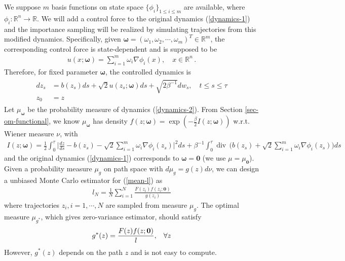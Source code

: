 \documentclass[final]{siamltex}
\begin{document}
We suppose $m$ basis functions on state space $\{\phi_i\}_{1\le i \le m}$ are
available, where $\phi_i : \mathbb{R}^n\rightarrow \mathbb{R}$. 
We will add a control force to the original dynamics (\ref{dynamics-1})
and the importance sampling will be realized by simulating trajectories from
this modified dynamics. Specifically, given $\bm{\omega} = (\omega_1, \omega_2,
\cdots, \omega_m)^T \in \mathbb{R}^m$,
the corresponding control force is state-dependent and is supposed to be 
\begin{align}
  u(x; \bm{\omega}) = \sum\limits_{i = 1}^{m} \omega_i \nabla \phi_i(x), \quad x \in
  \mathbb{R}^n\,.
  \label{control-force}
\end{align}
Therefore, for fixed parameter $\bm{\omega}$, the controlled dynamics is 
\begin{align}
\begin{split}
  d z_s &= b(z_s) ds + \sqrt{2}u(z_s;\bm{\omega}) ds + \sqrt{2\beta^{-1}} dw_s, \quad t \le s \le \tau \\
     z_0 &=z
  \end{split}
\label{dynamics-2}
\end{align}
Let $\mu_{\bm{\omega}}$ be the probability measure of dynamics (\ref{dynamics-2}). 
From Section \ref{sec-om-functional},  we know $\mu_{\bm{\omega}}$ has density 
$f(z;\bm{\omega}) = \exp(-\frac{\beta}{2} I(z ; \bm{\omega}))$ w.r.t. Wiener
measure $\nu$, with
\begin{align}
  I(z ; \bm{\omega}) = \frac{1}{2}\int_0^\tau \Big|\frac{dz}{ds}- b(z_s) -
  \sqrt{2}\sum\limits_{i = 1}^{m} \omega_i \nabla \phi_i(z_s)\Big|^2 ds + \beta^{-1}
  \int_0^\tau \operatorname{div}\, \Big(b(z_s) + \sqrt{2}\sum\limits_{i =
  1}^{m} \omega_i \nabla \phi_i(z_s)\Big) ds
  \label{om-fun-w}
\end{align}
and the original dynamics (\ref{dynamics-1}) corresponds to $\bm{\omega} = \bm{0}$ (we use $\mu = \mu_{\bm{0}}$).
Given a probability measure $\mu_g$ on path space with $d\mu_g = g(z)d\nu$, 
we can design a unbiased Monte Carlo estimator for (\ref{mean-l}) as 
\begin{align}
  l_N = \frac{1}{N} \sum_{i=1}^{N}  \frac{F(z_i)f(z_i;\bm{0})}{g(z_i)}
\end{align}
where trajectories $z_i, i = 1, \cdots, N$ are sampled from measure $\mu_g$.
The optimal measure $\mu_{g^*}$, which gives
zero-variance estimator, should satisfy 
\begin{align}
  g^*(z) = \frac{F(z)f(z;\bm{0})}{l}, \hspace{3mm} \forall z
  \label{optimal_pdf}
\end{align}
However, $g^*(z)$ depends on the path $z$ and is not easy to compute. 
\end{document}
